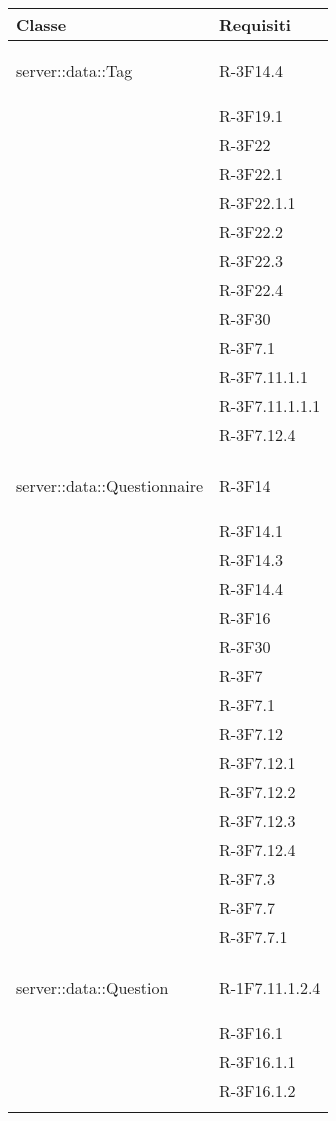\begin{longtable}{l p{3cm}}
	\midrule
	\textbf{Classe} & \textbf{Requisiti}\tabularnewline
	\midrule
	\midrule
	\hypertarget{server::data::Tag}{server::data::Tag} & R-3F14.4 \tabularnewline &
	
	R-3F19.1 \tabularnewline &
	
	R-3F22 \tabularnewline &
	
	R-3F22.1 \tabularnewline &
	
	R-3F22.1.1 \tabularnewline &
	
	R-3F22.2 \tabularnewline &
	
	R-3F22.3 \tabularnewline &
	
	R-3F22.4 \tabularnewline &
	
	R-3F30 \tabularnewline &
	
	R-3F7.1 \tabularnewline &
	
	R-3F7.11.1.1 \tabularnewline &
	
	R-3F7.11.1.1.1 \tabularnewline &
	
	R-3F7.12.4 \tabularnewline &\tabularnewline
	\hline
	\hypertarget{server::data::Questionnaire}{server::data::Questionnaire} & R-3F14 \tabularnewline &
	
	R-3F14.1 \tabularnewline &
	
	R-3F14.3 \tabularnewline &
	
	R-3F14.4 \tabularnewline &
	
	R-3F16 \tabularnewline &
	
	R-3F30 \tabularnewline &
	
	R-3F7 \tabularnewline &
	
	R-3F7.1 \tabularnewline &
	
	R-3F7.12 \tabularnewline &
	
	R-3F7.12.1 \tabularnewline &
	
	R-3F7.12.2 \tabularnewline &
	
	R-3F7.12.3 \tabularnewline &
	
	R-3F7.12.4 \tabularnewline &
	
	R-3F7.3 \tabularnewline &
	
	R-3F7.7 \tabularnewline &
	
	R-3F7.7.1 \tabularnewline &\tabularnewline
	\hline
	\hypertarget{server::data::Question}{server::data::Question} & R-1F7.11.1.2.4 \tabularnewline &
	
	R-3F16.1 \tabularnewline &
	
	R-3F16.1.1 \tabularnewline &
	
	R-3F16.1.2 \tabularnewline &
	

\end{longtable}
